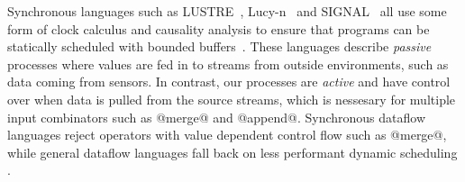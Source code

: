 



Synchronous languages such as LUSTRE~\cite{halbwachs1991synchronous}, Lucy-n~\cite{mandel2010lucy} and SIGNAL~\cite{le2003polychrony} all use some form of clock calculus and causality analysis to ensure that programs can be statically scheduled with bounded buffers~\cite{caspi1996:kahn}. These languages describe \emph{passive} processes where values are fed in to streams from outside environments, such as data coming from sensors. In contrast, our processes are \emph{active} and have control over when data is pulled from the source streams, which is nessesary for multiple input combinators such as @merge@ and  @append@.
Synchronous dataflow languages reject operators with value dependent control flow such as @merge@, while general dataflow languages fall back on less performant dynamic scheduling \cite{bouakaz2013real}.





